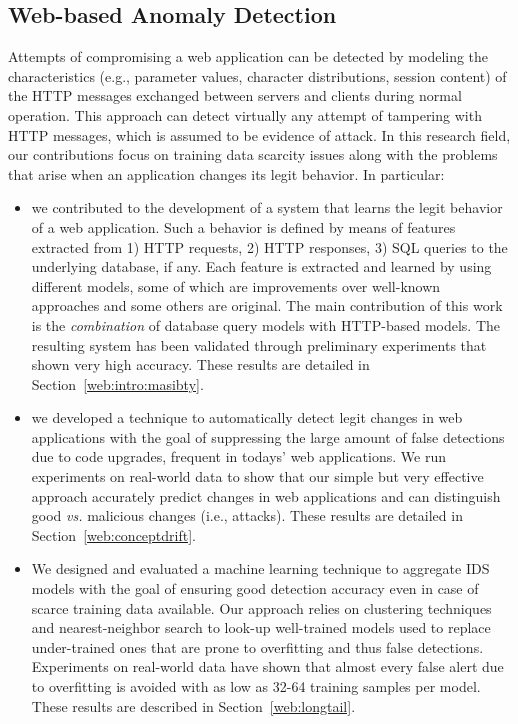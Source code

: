 \subsection{Web-based Anomaly Detection} Attempts of compromising a
web application can be detected by modeling the characteristics (e.g.,
parameter values, character distributions, session content) of the
\ac{HTTP} messages exchanged between servers and clients
during normal operation. This approach can detect virtually any
attempt of tampering with \ac{HTTP} messages, which is
assumed to be evidence of attack. In this research field, our
contributions focus on training data scarcity issues along with the
problems that arise when an application changes its legit behavior. In
particular:

\begin{itemize}
\item we contributed to the development of a system that learns the
  legit behavior of a web application. Such a behavior is defined by
  means of features extracted from 1) HTTP requests, 2) HTTP
  responses, 3) SQL queries to the underlying database, if any. Each
  feature is extracted and learned by using different models, some of
  which are improvements over well-known approaches and some others
  are original. The main contribution of this work is the
  \emph{combination} of database query models with HTTP-based
  models. The resulting system has been validated through preliminary
  experiments that shown very high accuracy. These results are
  detailed in Section~\ref{web:intro:masibty}.
\item we developed a technique to automatically detect legit changes
  in web applications with the goal of suppressing the large amount of
  false detections due to code upgrades, frequent in todays' web
  applications. We run experiments on real-world data to show that our
  simple but very effective approach accurately predict changes in web
  applications and can distinguish good \emph{vs.} malicious changes
  (i.e., attacks). These results are detailed in
  Section~\ref{web:conceptdrift}.
\item We designed and evaluated a machine learning technique to
  aggregate \ac{IDS} models with the goal of ensuring good detection
  accuracy even in case of scarce training data available. Our
  approach relies on clustering techniques and nearest-neighbor search
  to look-up well-trained models used to replace under-trained ones
  that are prone to overfitting and thus false detections. Experiments
  on real-world data have shown that almost every false alert due to
  overfitting is avoided with as low as 32-64 training samples per
  model. These results are described in Section~\ref{web:longtail}.
\end{itemize}

